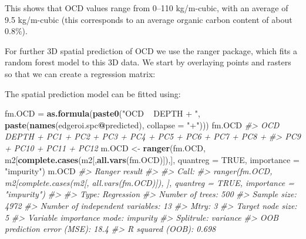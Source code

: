 \documentclass[graybox,natbib,nospthms,UStrade]{svmono}
\newenvironment{Shaded}{\begin{snugshade}}{\end{snugshade}}
\newcommand{\CommentTok}[1]{\textcolor[rgb]{0.37,0.37,0.37}{\textit{#1}}}
\newcommand{\DataTypeTok}[1]{\textcolor[rgb]{0.27,0.27,0.27}{#1}}
\newcommand{\KeywordTok}[1]{\textcolor[rgb]{0.27,0.27,0.27}{\textbf{#1}}}
\newcommand{\NormalTok}[1]{#1}
\newcommand{\OperatorTok}[1]{\textcolor[rgb]{0.43,0.43,0.43}{\textbf{#1}}}
\newcommand{\OtherTok}[1]{\textcolor[rgb]{0.37,0.37,0.37}{#1}}
\newcommand{\StringTok}[1]{\textcolor[rgb]{0.5,0.5,0.5}{#1}}
\begin{document}
This shows that OCD values range from 0--110 kg/m-cubic, with an average of 9.5 kg/m-cubic (this corresponds to an average organic carbon content of about 0.8\%).

For further 3D spatial prediction of OCD we use the ranger package, which fits a random forest model to this 3D data. We start by overlaying points and rasters so that we can create a regression matrix:

\begin{Shaded}
\end{Shaded}

The spatial prediction model can be fitted using:

\begin{Shaded}
\begin{Highlighting}[]
\NormalTok{fm.OCD =}\StringTok{ }\KeywordTok{as.formula}\NormalTok{(}\KeywordTok{paste0}\NormalTok{(}\StringTok{"OCD ~ DEPTH + "}\NormalTok{, }\KeywordTok{paste}\NormalTok{(}\KeywordTok{names}\NormalTok{(edgeroi.spc}\OperatorTok{@}\NormalTok{predicted), }\DataTypeTok{collapse =} \StringTok{"+"}\NormalTok{)))}
\NormalTok{fm.OCD}
\CommentTok{#> OCD ~ DEPTH + PC1 + PC2 + PC3 + PC4 + PC5 + PC6 + PC7 + PC8 + }
\CommentTok{#>     PC9 + PC10 + PC11 + PC12}
\NormalTok{m.OCD <-}\StringTok{ }\KeywordTok{ranger}\NormalTok{(fm.OCD, m2[}\KeywordTok{complete.cases}\NormalTok{(m2[,}\KeywordTok{all.vars}\NormalTok{(fm.OCD)]),], }
                \DataTypeTok{quantreg =} \OtherTok{TRUE}\NormalTok{, }\DataTypeTok{importance =} \StringTok{"impurity"}\NormalTok{)}
\NormalTok{m.OCD}
\CommentTok{#> Ranger result}
\CommentTok{#> }
\CommentTok{#> Call:}
\CommentTok{#>  ranger(fm.OCD, m2[complete.cases(m2[, all.vars(fm.OCD)]), ],      quantreg = TRUE, importance = "impurity") }
\CommentTok{#> }
\CommentTok{#> Type:                             Regression }
\CommentTok{#> Number of trees:                  500 }
\CommentTok{#> Sample size:                      4972 }
\CommentTok{#> Number of independent variables:  13 }
\CommentTok{#> Mtry:                             3 }
\CommentTok{#> Target node size:                 5 }
\CommentTok{#> Variable importance mode:         impurity }
\CommentTok{#> Splitrule:                        variance }
\CommentTok{#> OOB prediction error (MSE):       18.4 }
\CommentTok{#> R squared (OOB):                  0.698}
\end{Highlighting}
\end{Shaded}
\end{document}
